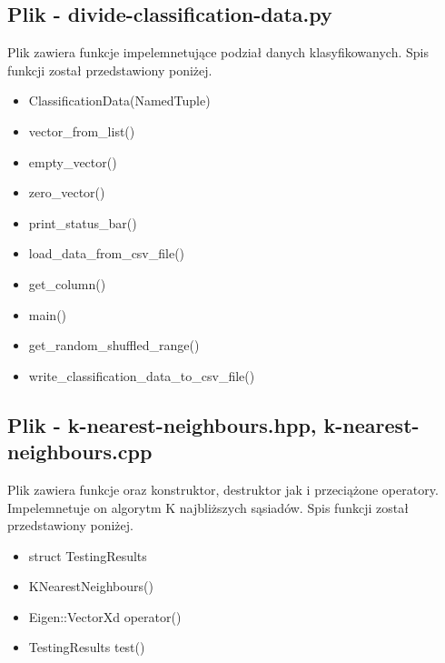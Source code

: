 \documentclass{classrep}
\begin{document}
{        \subsection{Plik - divide-classification-data.py}
        {
            Plik zawiera funkcje impelemnetujące podział danych klasyfikowanych.
            Spis funkcji został przedstawiony poniżej.
            \begin{itemize}
                \item ClassificationData(NamedTuple)
                \item vector\_from\_list()
                \item empty\_vector()
                \item zero\_vector()
                \item print\_status\_bar()
                \item load\_data\_from\_csv\_file()
                \item get\_column()
                \item main()
                \item get\_random\_shuffled\_range()
                \item write\_classification\_data\_to\_csv\_file()
            \end{itemize}
        }

        \subsection{Plik - k-nearest-neighbours.hpp, k-nearest-neighbours.cpp}
        {
            Plik zawiera funkcje oraz konstruktor, destruktor jak i przeciążone operatory.
            Impelemnetuje on algorytm K najbliższych sąsiadów.
            Spis funkcji został przedstawiony poniżej.
            \begin{itemize}
                \item struct TestingResults
                \item KNearestNeighbours()
                \item Eigen::VectorXd operator()
                \item TestingResults test()
            \end{itemize}
        }

}
\end{document}
